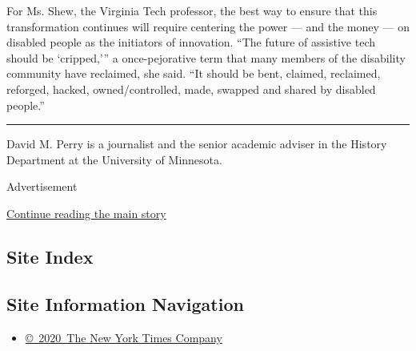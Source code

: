 For Ms. Shew, the Virginia Tech professor, the best way to ensure that
this transformation continues will require centering the power --- and
the money --- on disabled people as the initiators of innovation. ``The
future of assistive tech should be `cripped,''' a once-pejorative term
that many members of the disability community have reclaimed, she said.
``It should be bent, claimed, reclaimed, reforged, hacked,
owned/controlled, made, swapped and shared by disabled people.''

\begin{center}\rule{0.5\linewidth}{\linethickness}\end{center}

David M. Perry is a journalist and the senior academic adviser in the
History Department at the University of Minnesota.

Advertisement

\protect\hyperlink{after-bottom}{Continue reading the main story}

\hypertarget{site-index}{%
\subsection{Site Index}\label{site-index}}

\hypertarget{site-information-navigation}{%
\subsection{Site Information
Navigation}\label{site-information-navigation}}

\begin{itemize}
\tightlist
\item
  \href{https://help.nytimes.com/hc/en-us/articles/115014792127-Copyright-notice}{©~2020~The
  New York Times Company}
\end{itemize}

